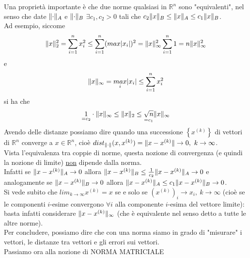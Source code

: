 \documentclass[12pt,a4paper]{article}
\DeclarePairedDelimiter{\norma}{\lVert}{\rVert}
\begin{document}
Una proprietà importante è che due norme qualsiasi in $\mathbb{R}^n$ sono "equivalenti", nel senso che date $\norma{\cdot}_A$ e $\norma{\cdot}_B$ $\exists c_1, c_2 > 0$ tali che  $c_2\norma{x}_B \leq \norma{x}_A \leq c_1\norma{x}_B$. \\
Ad esempio, siccome 
\begin{equation*}
        \norma{x}_2^2 = \sum_{i=1}^n x_i^2 \leq \sum_{i=1}^n (max\lvert x_i \rvert)^2 = \norma{x}_\infty^2 \sum_{i=1}^n 1 = n \norma{x}_\infty^2
\end{equation*}
e
\begin{equation*}
    \norma{x}_\infty = \underset{i}{max}\lvert x_i \rvert \leq \sum_{i=1}^n x_i^2
\end{equation*}
si ha che 
\begin{equation*}
    \underset{=c_2}{1} \cdot \norma{x}_\infty \leq \norma{x}_2 \leq \underset{=c_1}{\sqrt{n}} \norma{x}_\infty
\end{equation*}
Avendo delle distanze possiamo dire quando una successione $\left\{ x^{(k)} \right\}$ di vettori di $\mathbb{R}^n$ converge a $x \in \mathbb{R}^n$, cioè $dist_{\norma{\cdot}}(x,x^{(k)}) = \norma{x-x^{(k)}} \rightarrow 0, \ k \rightarrow \infty$.\\
Vista l'equivalenza tra coppie di norme, questa nozione di convergenza (e quindi la nozione di limite) \underline{non} dipende dalla norma.\\
Infatti se $\norma{x-x^{(k)}}_A \rightarrow 0$ allora $\norma{x-x^{(k)}}_B \leq \frac{1}{c_2}\norma{x-x^{(k)}}_A \rightarrow 0$ e analogamente se $\norma{x-x^{(k)}}_B \rightarrow 0$ allora $\norma{x-x^{(k)}}_A \leq c_1 \norma{x-x^{(k)}}_B \rightarrow 0$. \\
Si vede subito che $lim_{k\to \infty} x^{(k)} = x$
se e solo se $(x^{(k)})_i \rightarrow x_i, \ k \to \infty$ (cioè se le componenti $i$-esime convergono $\forall i$ alla componente $i$-esima del vettore limite): basta infatti considerare $\norma{x-x^{(k)}}_\infty$ (che è equivalente nel senso detto a tutte le altre norme).\\
Per concludere, possiamo dire che con una norma siamo in grado di "misurare" i vettori, le distanze tra vettori e gli errori sui vettori. \\
Passiamo ora alla nozione di NORMA MATRICIALE
\\
\end{document}

